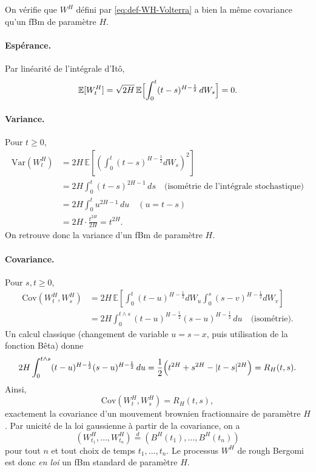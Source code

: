 \documentclass[11pt,a4paper]{article}
\newcommand{\E}{\mathbb{E}}
\newcommand{\Var}{\mathrm{Var}}
\newcommand{\Cov}{\mathrm{Cov}}
\newcommand{\1}{\mathbf{1}}
\newcommand{\bH}{B^{H}}
\begin{document}
On vérifie que $W^H$ défini par \eqref{eq:def-WH-Volterra} a bien
la même covariance qu'un fBm de paramètre $H$.

\paragraph{Espérance.}
Par linéarité de l'intégrale d'Itô,
\begin{equation}
  \E[W_t^H]
  = \sqrt{2H}\,\E\Bigl[\int_0^t (t-s)^{H-\frac12}\,dW_s\Bigr]
  = 0.
\end{equation}

\paragraph{Variance.}
Pour $t\ge 0$,
\begin{align}
  \Var(W_t^H)
  &= 2H\,\E\left[\left(
        \int_0^t (t-s)^{H-\frac12} dW_s
      \right)^2\right] \\
  &= 2H \int_0^t (t-s)^{2H-1}\,ds
     \quad\text{(isométrie de l'intégrale stochastique)}  \\[0.3em]
  &= 2H \int_0^t u^{2H-1}\,du
     \quad (u = t-s) \\[0.3em]
  &= 2H \cdot \frac{t^{2H}}{2H}
   = t^{2H}.
\end{align}
On retrouve donc la variance d'un fBm de paramètre $H$.

\paragraph{Covariance.}
Pour $s,t\ge 0$,
\begin{align}
  \Cov(W_t^H,W_s^H)
  &= 2H\,\E\left[
      \int_0^t (t-u)^{H-\frac12} dW_u
      \int_0^s (s-v)^{H-\frac12} dW_v
    \right] \\[0.3em]
  &= 2H \int_0^{t\wedge s}
          (t-u)^{H-\frac12}(s-u)^{H-\frac12}\,du
     \quad\text{(isométrie)}.
\end{align}
Un calcul classique (changement de variable $u=s-x$, puis utilisation
de la fonction Bêta) donne
\begin{equation}
  2H \int_0^{t\wedge s}
          (t-u)^{H-\frac12}(s-u)^{H-\frac12}\,du
  = \frac{1}{2}\Bigl(t^{2H}+s^{2H}-|t-s|^{2H}\Bigr)
  = R_H(t,s).
\end{equation}
Ainsi,
\begin{equation}
  \Cov(W_t^H,W_s^H) = R_H(t,s),
\end{equation}
exactement la covariance d'un mouvement brownien fractionnaire de
paramètre $H$. Par unicité de la loi gaussienne à partir de la
covariance, on a
\begin{equation}
  (W_{t_1}^H,\dots,W_{t_n}^H)
  \stackrel{d}{=}
  (\bH(t_1),\dots,\bH(t_n))
\end{equation}
pour tout $n$ et tout choix de temps $t_1,\dots,t_n$. Le processus
$W^H$ de rough Bergomi est donc \emph{en loi} un fBm standard de
paramètre $H$.
\end{document}
